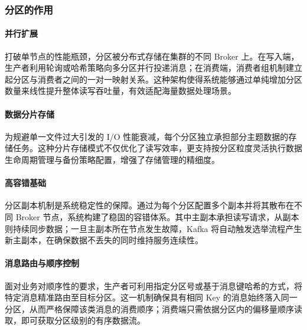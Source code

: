 		\subsubsection{分区的作用}
			\paragraph{并行扩展}
			打破单节点的性能瓶颈，分区被分布式存储在集群的不同 Broker 上。在写入端，生产者利用轮询或哈希策略向多分区并行投递消息；在消费端，消费者组机制建立起分区与消费者之间的一对一映射关系。这种架构使得系统能够通过单纯增加分区数量来线性提升整体读写吞吐量，有效适配海量数据处理场景\cite{landau2022kafkaconsumergroupautoscaler}。
			
			\paragraph{数据分片存储}
			为规避单一文件过大引发的 I/O 性能衰减，每个分区独立承担部分主题数据的存储任务。这种分片存储模式不仅优化了读写效率，更支持按分区粒度灵活执行数据生命周期管理与备份策略配置，增强了存储管理的精细度。
			
			\paragraph{高容错基础}
			分区副本机制是系统稳定性的保障。通过为每个分区配置多个副本并将其散布在不同 Broker 节点，系统构建了稳固的容错体系。其中主副本承担读写请求，从副本则持续同步数据；一旦主副本所在节点发生故障，Kafka 将自动触发选举流程产生新主副本，在确保数据不丢失的同时维持服务连续性。
			
			\paragraph{消息路由与顺序控制}
			面对业务对顺序性的要求，生产者可利用指定分区号或基于消息键哈希的方式，将特定消息精准路由至目标分区。这一机制确保具有相同 Key 的消息始终落入同一分区，从而严格保障该类消息的消费顺序；消费端只需依据分区内的偏移量顺序读取，即可获取分区级别的有序数据流。
